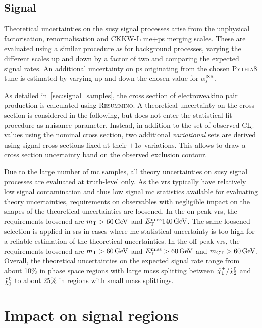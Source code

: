  \subsection{Signal}\label{sec:signal_theory_uncertainties}
 
 Theoretical uncertainties on the \gls{susy} signal processes arise from the unphysical factorisation, renormalisation and CKKW-L \gls{me}+\gls{ps} merging scales. These are evaluated using a similar procedure as for background processes, varying the different scales up and down by a factor of two and comparing the expected signal rates. An additional uncertainty on \gls{ps} originating from the chosen \textsc{Pythia8} tune is estimated by varying up and down the chosen value for $\alpha_s^\mathrm{ISR}$.    
 
 As detailed in~\cref{sec:signal_samples}, the cross section of electroweakino pair production is calculated using \textsc{Resummino}. A theoretical uncertainty on the cross section is considered in the following, but does not enter the statistical fit procedure as nuisance parameter. Instead, in addition to the set of observed CL$_s$ values using the nominal cross section, two additional \textit{variational} sets are derived using signal cross sections fixed at their $\pm 1\sigma$ variations. This allows to draw a cross section uncertainty band on the observed exclusion contour. 

Due to the large number of \gls{mc} samples, all theory uncertainties on \gls{susy} signal processes are evaluated at truth-level only.   As the \glspl{vr} typically have relatively low signal contamination and thus low signal \gls{mc} statistics available for evaluating theory uncertainties, requirements on observables with negligible impact on the shapes of the theoretical uncertainties are loosened. In the on-peak \glspl{vr}, the requirements loosened are $\mt>\SI{60}{\GeV}$ and $\etmiss\SI{140}{\GeV}$. The same loosened selection is applied in \glspl{sr} in cases where \gls{mc} statistical uncertainty is too high for a reliable estimation of the theoretical uncertainties. In the off-peak \glspl{vr}, the requirements loosened are $\mt>\SI{60}{\GeV}$ and $\etmiss>\SI{60}{\GeV}$ and $\mct>\SI{60}{\GeV}$. Overall, the theoretical uncertainties on the expected signal rate range from about 10\% in phase space regions with large mass splitting between $\tilde{\chi}_1^\pm/\tilde{\chi}_2^0$ and $\tilde{\chi}_1^0$ to about 25\% in regions with small mass splittings.
 
 
\section{Impact on signal regions}

